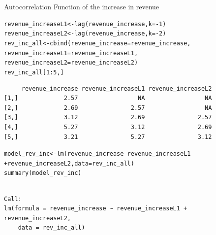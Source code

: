 \documentclass{beamer}\usepackage[]{graphicx}\usepackage[]{color}
\makeatletter
\newcommand{\hlnum}[1]{\textcolor[rgb]{0.824,0.412,0.118}{#1}}%
\newcommand{\hlopt}[1]{\textcolor[rgb]{1,0.894,0.769}{#1}}%
\newcommand{\hlstd}[1]{\textcolor[rgb]{1,0.894,0.769}{#1}}%
\newcommand{\hlkwb}[1]{\textcolor[rgb]{0.804,0.776,0.451}{#1}}%
\newcommand{\hlkwc}[1]{\textcolor[rgb]{0.78,0.941,0.545}{#1}}%
\newcommand{\hlkwd}[1]{\textcolor[rgb]{1,0.78,0.769}{#1}}%
\newenvironment{kframe}{%
 \def\at@end@of@kframe{}%
 \ifinner\ifhmode%
  \def\at@end@of@kframe{\end{minipage}}%
  \begin{minipage}{\columnwidth}%
 \fi\fi%
 \def\FrameCommand##1{\hskip\@totalleftmargin \hskip-\fboxsep
 \colorbox{shadecolor}{##1}\hskip-\fboxsep
     \hskip-\linewidth \hskip-\@totalleftmargin \hskip\columnwidth}%
 \MakeFramed {\advance\hsize-\width
   \@totalleftmargin\z@ \linewidth\hsize
   \@setminipage}}%
 {\par\unskip\endMakeFramed%
 \at@end@of@kframe}
\newenvironment{knitrout}{}{} %
\makeatother
\begin{document}
\begin{darkframes}
\begin{frame}[fragile]{Autocorrelation Function of the increase in revenue}
    \end{frame}
    
    
     \begin{frame}[fragile]
     \fontsize{8}{8}\selectfont
\begin{knitrout}
\begin{kframe}
\begin{alltt}
\hlstd{revenue_increaseL1} \hlkwb{<-} \hlkwd{lag}\hlstd{(revenue_increase,} \hlkwc{k}\hlstd{=}\hlopt{-}\hlnum{1}\hlstd{)}
\hlstd{revenue_increaseL2} \hlkwb{<-} \hlkwd{lag}\hlstd{(revenue_increase,} \hlkwc{k}\hlstd{=}\hlopt{-}\hlnum{2}\hlstd{)}
\hlstd{rev_inc_all} \hlkwb{<-} \hlkwd{cbind}\hlstd{(}\hlkwc{revenue_increase} \hlstd{= revenue_increase,}
                     \hlkwc{revenue_increaseL1} \hlstd{= revenue_increaseL1,}
                     \hlkwc{revenue_increaseL2} \hlstd{= revenue_increaseL2)}
\hlstd{rev_inc_all[}\hlnum{1}\hlopt{:}\hlnum{5}\hlstd{,]}
\end{alltt}
\begin{verbatim}
     revenue_increase revenue_increaseL1 revenue_increaseL2
[1,]             2.57                 NA                 NA
[2,]             2.69               2.57                 NA
[3,]             3.12               2.69               2.57
[4,]             5.27               3.12               2.69
[5,]             3.21               5.27               3.12
\end{verbatim}
\end{kframe}
\end{knitrout}
    
     \end{frame}
     
     
     \begin{frame}[fragile]
     \fontsize{8}{8}\selectfont
\begin{knitrout}
\begin{kframe}
\begin{alltt}
\hlstd{model_rev_inc} \hlkwb{<-} \hlkwd{lm}\hlstd{(revenue_increase} \hlopt{~} \hlstd{revenue_increaseL1}
                      \hlopt{+} \hlstd{revenue_increaseL2,} \hlkwc{data}\hlstd{=rev_inc_all)}
\hlkwd{summary}\hlstd{(model_rev_inc)}
\end{alltt}
\begin{verbatim}

Call:
lm(formula = revenue_increase ~ revenue_increaseL1 + revenue_increaseL2, 
    data = rev_inc_all)


\end{verbatim}
\end{kframe}
\end{knitrout}
\end{frame}
\end{darkframes}
\end{document}
